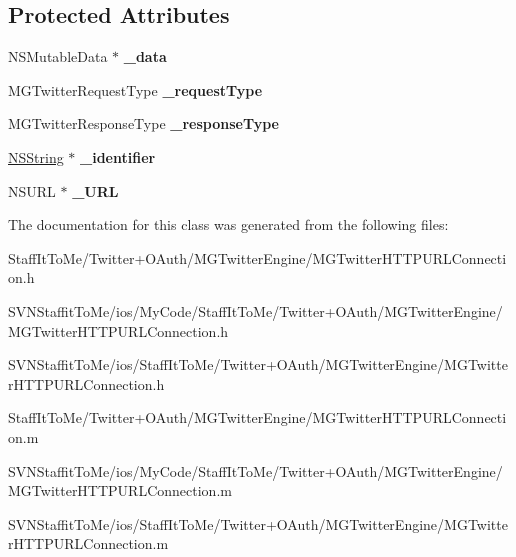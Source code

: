 \subsection*{\-Protected \-Attributes}
\begin{DoxyCompactItemize}
\item 
\hypertarget{interface_m_g_twitter_h_t_t_p_u_r_l_connection_af98adebbd0847d2932524d77a19d267f}{
\-N\-S\-Mutable\-Data $\ast$ {\bfseries \-\_\-data}}
\label{interface_m_g_twitter_h_t_t_p_u_r_l_connection_af98adebbd0847d2932524d77a19d267f}

\item 
\hypertarget{interface_m_g_twitter_h_t_t_p_u_r_l_connection_a9194465eac44944058a47bb55252af97}{
\-M\-G\-Twitter\-Request\-Type {\bfseries \-\_\-request\-Type}}
\label{interface_m_g_twitter_h_t_t_p_u_r_l_connection_a9194465eac44944058a47bb55252af97}

\item 
\hypertarget{interface_m_g_twitter_h_t_t_p_u_r_l_connection_abc5e33b0239a3adf00e0eef704d56eec}{
\-M\-G\-Twitter\-Response\-Type {\bfseries \-\_\-response\-Type}}
\label{interface_m_g_twitter_h_t_t_p_u_r_l_connection_abc5e33b0239a3adf00e0eef704d56eec}

\item 
\hypertarget{interface_m_g_twitter_h_t_t_p_u_r_l_connection_a2156235a1c57f570db82c995bc119d26}{
\hyperlink{class_n_s_string}{\-N\-S\-String} $\ast$ {\bfseries \-\_\-identifier}}
\label{interface_m_g_twitter_h_t_t_p_u_r_l_connection_a2156235a1c57f570db82c995bc119d26}

\item 
\hypertarget{interface_m_g_twitter_h_t_t_p_u_r_l_connection_a059fb35f52713d3db7deaec159ac9a14}{
\-N\-S\-U\-R\-L $\ast$ {\bfseries \-\_\-\-U\-R\-L}}
\label{interface_m_g_twitter_h_t_t_p_u_r_l_connection_a059fb35f52713d3db7deaec159ac9a14}

\end{DoxyCompactItemize}


\-The documentation for this class was generated from the following files\-:\begin{DoxyCompactItemize}
\item 
\-Staff\-It\-To\-Me/\-Twitter+\-O\-Auth/\-M\-G\-Twitter\-Engine/\-M\-G\-Twitter\-H\-T\-T\-P\-U\-R\-L\-Connection.\-h\item 
\-S\-V\-N\-Staffit\-To\-Me/ios/\-My\-Code/\-Staff\-It\-To\-Me/\-Twitter+\-O\-Auth/\-M\-G\-Twitter\-Engine/\-M\-G\-Twitter\-H\-T\-T\-P\-U\-R\-L\-Connection.\-h\item 
\-S\-V\-N\-Staffit\-To\-Me/ios/\-Staff\-It\-To\-Me/\-Twitter+\-O\-Auth/\-M\-G\-Twitter\-Engine/\-M\-G\-Twitter\-H\-T\-T\-P\-U\-R\-L\-Connection.\-h\item 
\-Staff\-It\-To\-Me/\-Twitter+\-O\-Auth/\-M\-G\-Twitter\-Engine/\-M\-G\-Twitter\-H\-T\-T\-P\-U\-R\-L\-Connection.\-m\item 
\-S\-V\-N\-Staffit\-To\-Me/ios/\-My\-Code/\-Staff\-It\-To\-Me/\-Twitter+\-O\-Auth/\-M\-G\-Twitter\-Engine/\-M\-G\-Twitter\-H\-T\-T\-P\-U\-R\-L\-Connection.\-m\item 
\-S\-V\-N\-Staffit\-To\-Me/ios/\-Staff\-It\-To\-Me/\-Twitter+\-O\-Auth/\-M\-G\-Twitter\-Engine/\-M\-G\-Twitter\-H\-T\-T\-P\-U\-R\-L\-Connection.\-m\end{DoxyCompactItemize}
